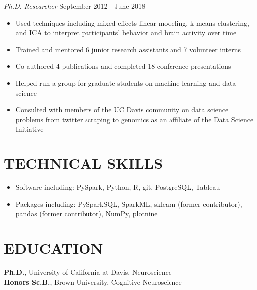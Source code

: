 \documentclass[line,margin,10pt]{res}
\begin{document}
\begin{resume}
{\sl Ph.D. Researcher} \hfill September 2012 - June 2018
\begin{itemize} \itemsep -2pt
\item Used techniques including mixed effects linear modeling, k-means clustering, and ICA to interpret participants' behavior and brain activity over time
\item Trained and mentored 6 junior research assistants and 7 volunteer interns
\item Co-authored 4 publications and completed 18 conference presentations
\item Helped run a group for graduate students on machine learning and data science
\item Consulted with members of the UC Davis community on data science problems from twitter scraping to genomics as an affiliate of the Data Science Initiative
\end{itemize}


 \section{TECHNICAL SKILLS} 
 \begin{itemize}[leftmargin=-2pt] \itemsep -2pt
\item [] Software including: PySpark, Python, R, git, PostgreSQL, Tableau
\item []Packages including: PySparkSQL, SparkML, sklearn (former contributor), pandas (former contributor), NumPy, plotnine %
 \end{itemize}


\section{EDUCATION} 
\textbf{Ph.D.}, University of California at Davis, Neuroscience\\
\textbf{Honors Sc.B.}, Brown University, Cognitive Neuroscience%
 

\end{resume}
\end{document}
